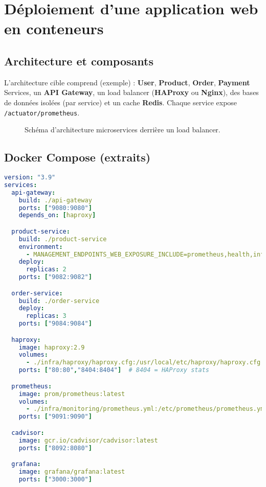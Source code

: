 \chapter{Déploiement d'une application web en conteneurs}

\section{Architecture et composants}
L'architecture cible comprend (exemple) : \textbf{User}, \textbf{Product}, \textbf{Order}, \textbf{Payment} Services,
un \textbf{API Gateway}, un load balancer (\textbf{HAProxy} ou \textbf{Nginx}), des bases de données isolées
(par service) et un cache \textbf{Redis}. Chaque service expose \texttt{/actuator/prometheus}.

\begin{figure}[H]
\centering
{}
\caption{Schéma d'architecture microservices derrière un load balancer.}
\end{figure}

\section{Docker Compose (extraits)}
\begin{lstlisting}[language=YAML, caption={docker-compose.yml (extrait – services, scaling)}, label={lst:compose}]
version: "3.9"
services:
  api-gateway:
    build: ./api-gateway
    ports: ["9080:9080"]
    depends_on: [haproxy]

  product-service:
    build: ./product-service
    environment:
      - MANAGEMENT_ENDPOINTS_WEB_EXPOSURE_INCLUDE=prometheus,health,info
    deploy:
      replicas: 2
    ports: ["9082:9082"]

  order-service:
    build: ./order-service
    deploy:
      replicas: 3
    ports: ["9084:9084"]

  haproxy:
    image: haproxy:2.9
    volumes:
      - ./infra/haproxy/haproxy.cfg:/usr/local/etc/haproxy/haproxy.cfg:ro
    ports: ["80:80","8404:8404"]  # 8404 = HAProxy stats

  prometheus:
    image: prom/prometheus:latest
    volumes:
      - ./infra/monitoring/prometheus.yml:/etc/prometheus/prometheus.yml:ro
    ports: ["9091:9090"]

  cadvisor:
    image: gcr.io/cadvisor/cadvisor:latest
    ports: ["8092:8080"]

  grafana:
    image: grafana/grafana:latest
    ports: ["3000:3000"]
\end{lstlisting}

